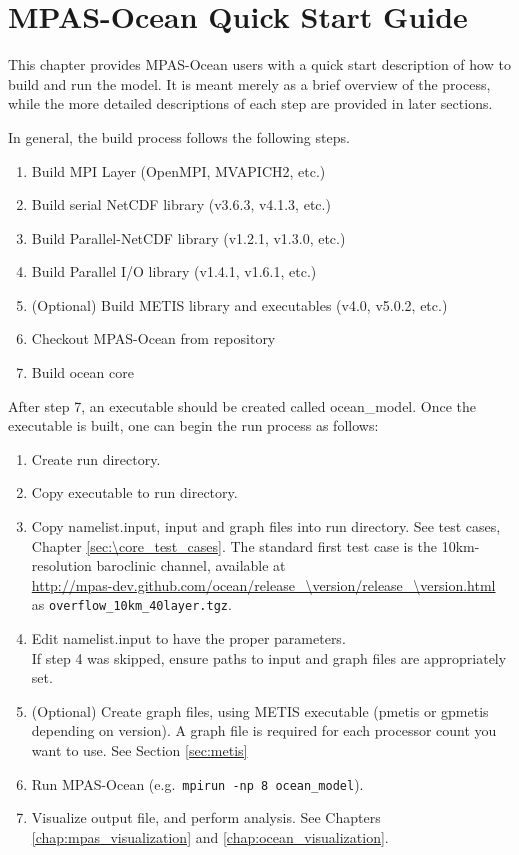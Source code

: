 \chapter{MPAS-Ocean Quick Start Guide}
\label{chap:quick_start}

This chapter provides MPAS-Ocean users with a quick start description of how to
build and run the model. It is meant merely as a brief overview of the process,
while the more detailed descriptions of each step are provided in later
sections.

In general, the build process follows the following steps.

\begin{enumerate}
	\item Build MPI Layer (OpenMPI, MVAPICH2, etc.)
	\item Build serial NetCDF library (v3.6.3, v4.1.3, etc.)
	\item Build Parallel-NetCDF library (v1.2.1, v1.3.0, etc.)
	\item Build Parallel I/O library (v1.4.1, v1.6.1, etc.)
	\item (Optional) Build METIS library and executables (v4.0, v5.0.2, etc.)
	\item Checkout MPAS-Ocean from repository
	\item Build ocean core
\end{enumerate}

After step 7, an executable should be created called ocean\_model. Once the executable is built, one can begin the run process as follows:

\begin{enumerate}
	\item Create run directory.
	\item Copy executable to run directory.
	\item Copy namelist.input, input and graph files into run directory.  See test cases, Chapter \ref{sec:\core_test_cases}.  The standard first test case is the 10km-resolution baroclinic channel, available at\\
 \url{http://mpas-dev.github.com/ocean/release_\version/release_\version.html} \\
as {\tt overflow\_10km\_40layer.tgz}.
	\item Edit namelist.input to have the proper parameters. \\
		  If step 4 was skipped, ensure paths to input and graph files are appropriately set.
	\item (Optional) Create graph files, using METIS executable (pmetis or gpmetis depending on version).  A graph file is required for each processor count you want to use.  See Section \ref{sec:metis}
	\item Run MPAS-Ocean (e.g.\ {\tt mpirun -np 8 ocean\_model}).
	\item Visualize output file, and perform analysis.  See Chapters \ref{chap:mpas_visualization} and \ref{chap:ocean_visualization}.
\end{enumerate}
